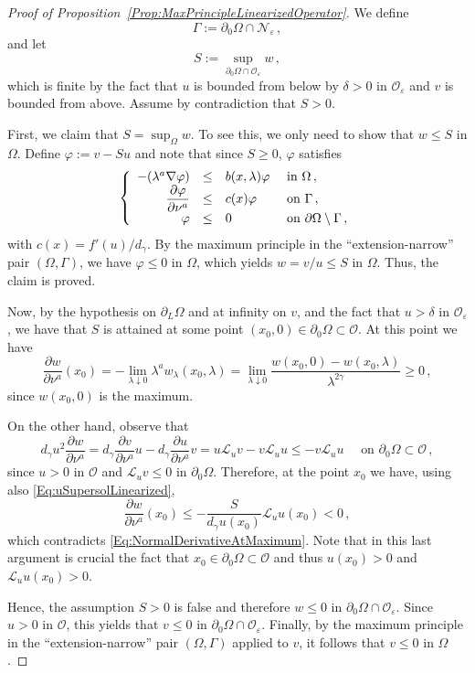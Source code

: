 \documentclass[twoside,leqno,symbols-for-thanks, draft]{rmi}
\numberwithin{equation}{section}
\theoremstyle{definition}
\newcommand{\ncal}{\mathcal{N}}
\newcommand{\ocal}{\mathcal{O}}
\newcommand{\s}{\gamma}
\newcommand\beqc[1]{\left\{\begin{array}{#1}}
\newcommand\eeqc{\end{array} \right.}
\def\PDEsystem{rcll}
\let\div\relax
\DeclareMathOperator{\div}{div}
\begin{document}
\begin{proof}[Proof of Proposition~\ref{Prop:MaxPrincipleLinearizedOperator}]
	We define
	$$
	\Gamma := \partial_0 \Omega \cap \ncal_\varepsilon\,,
	$$
	and let
	$$
	S := \sup_{\partial_0 \Omega \cap \ocal_\varepsilon } w\,,
	$$
	which is finite by the fact that $u$ is bounded from below  by $\delta>0$ in $\ocal_\varepsilon$ and $v$ is bounded from above. Assume by contradiction that $S > 0$.
	
	First, we claim that $S = \sup_\Omega w$. To see this, we only need to show that $w \leq S$ in $\Omega$. Define $\varphi := v -Su$ and note that since $S\geq 0$, $\varphi$ satisfies 
	$$
	\beqc{\PDEsystem}
	-\div(\lambda^a \nabla \varphi) &\leq& b(x,\lambda) \varphi & \text{ in } \Omega \,, \\
	\dfrac{\partial \varphi}{\partial \nu^a}  &\leq & c(x) \varphi & \text{ on } \Gamma \,, \\
	\varphi & \leq & 0 & \text{ on } \partial \Omega \setminus \Gamma  \,,
	\eeqc
	$$
	with $c(x) = f'(u) / d_\s$. By the maximum principle in the ``extension-narrow'' pair $(\Omega,\Gamma)$, we have $\varphi \leq 0$ in $\Omega$, which yields $w = v/u \leq S$ in $\Omega$. Thus, the claim is proved.
	
	Now, by the hypothesis on $\partial_L \Omega$ and at infinity on $v$, and the fact that $u>\delta$ in $\ocal_{\varepsilon}$, we have that $S$ is attained at some point  $(x_0,0)\in\partial_0\Omega \subset \ocal$. At this point we have
	\begin{equation}
	\label{Eq:NormalDerivativeAtMaximum}
	\dfrac{\partial w}{\partial \nu^a}(x_0) = -\lim_{\lambda \downarrow 0} \lambda^a w_\lambda (x_0,\lambda) = \lim_{\lambda \downarrow 0} \dfrac{w(x_0,0) - w(x_0, \lambda)}{\lambda^{2\s}} \geq 0\,,
	\end{equation}
	since $w(x_0,0)$ is the maximum.
	
	On the other hand, observe that
	$$
	d_\s u^2 \dfrac{\partial w}{\partial \nu^a} = d_\s  \dfrac{\partial v}{\partial \nu^a} u  - d_\s  \dfrac{\partial u}{\partial \nu^a} v = u \mathscr{L}_u v  -  v \mathscr{L}_u u \leq -v \mathscr{L}_u u \quad \text{ on } \partial_0 \Omega \subset \ocal\,,
	$$
	since $u>0$ in $\ocal$ and $\mathscr{L}_u v \leq 0$ in $\partial_0 \Omega $. Therefore, at the point $x_0$ we have, using also \eqref{Eq:uSupersolLinearized}, 
	$$
	\dfrac{\partial w}{\partial \nu^a}(x_0) \leq -\dfrac{S}{d_\s u(x_0)} \mathscr{L}_u u(x_0) < 0\,,
	$$
	which contradicts \eqref{Eq:NormalDerivativeAtMaximum}. Note that in this last argument is crucial the fact that $x_0 \in \partial_0 \Omega \subset \ocal$ and thus $u(x_0)>0$ and $\mathscr{L}_u u (x_0) > 0$. 
	
	Hence, the assumption $S>0$ is false and therefore $w \leq 0$ in $\partial_0 \Omega \cap \ocal_\varepsilon $. Since $u > 0$ in $\ocal$, this yields that $v \leq 0$ in $\partial_0 \Omega \cap \ocal_\varepsilon $. Finally, by the maximum principle in the ``extension-narrow'' pair $(\Omega, \Gamma)$ applied to $v$, it follows that $v\leq 0$ in $\Omega$.
\end{proof}
\end{document}
